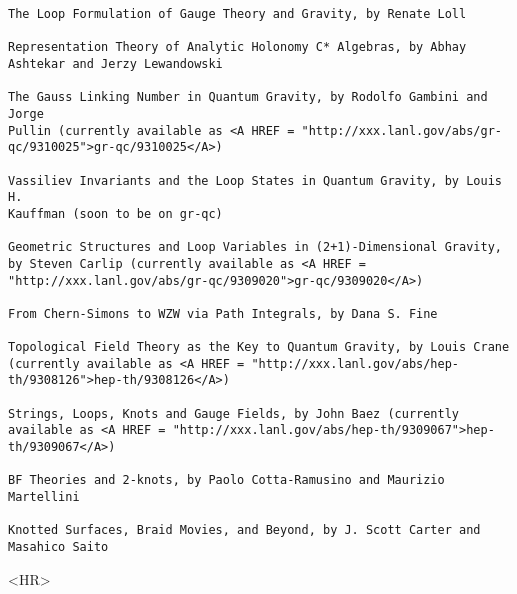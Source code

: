 \begin{verbatim}
The Loop Formulation of Gauge Theory and Gravity, by Renate Loll

Representation Theory of Analytic Holonomy C* Algebras, by Abhay
Ashtekar and Jerzy Lewandowski 

The Gauss Linking Number in Quantum Gravity, by Rodolfo Gambini and Jorge
Pullin (currently available as <A HREF = "http://xxx.lanl.gov/abs/gr-qc/9310025">gr-qc/9310025</A>)

Vassiliev Invariants and the Loop States in Quantum Gravity, by Louis H.
Kauffman (soon to be on gr-qc)

Geometric Structures and Loop Variables in (2+1)-Dimensional Gravity,
by Steven Carlip (currently available as <A HREF = "http://xxx.lanl.gov/abs/gr-qc/9309020">gr-qc/9309020</A>)

From Chern-Simons to WZW via Path Integrals, by Dana S. Fine

Topological Field Theory as the Key to Quantum Gravity, by Louis Crane
(currently available as <A HREF = "http://xxx.lanl.gov/abs/hep-th/9308126">hep-th/9308126</A>)

Strings, Loops, Knots and Gauge Fields, by John Baez (currently
available as <A HREF = "http://xxx.lanl.gov/abs/hep-th/9309067">hep-th/9309067</A>)

BF Theories and 2-knots, by Paolo Cotta-Ramusino and Maurizio Martellini

Knotted Surfaces, Braid Movies, and Beyond, by J. Scott Carter and
Masahico Saito 
\end{verbatim}
    
<HR>



